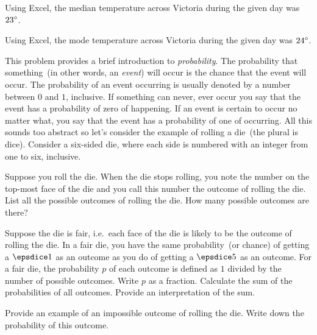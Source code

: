\documentclass[a4paper,oneside,12pt]{article}
\begin{document}
\begin{problem}
{\begin{solution}
Using Excel, the median temperature across Victoria during the given
day was ${23}^{\circ}$.

Using Excel, the mode temperature across Victoria during the given day
was ${24}^{\circ}$.
\end{solution}
}{}

\item\label{prob:fair_die}
  This problem provides a brief introduction to \emph{probability}.
  The probability that something~(in other words, an \emph{event})
  will occur is the chance that the event will occur.  The probability
  of an event occurring is usually denoted by a number between $0$ and
  $1$, inclusive.  If something can never, ever occur you say that the
  event has a probability of zero of happening.  If an event is
  certain to occur no matter what, you say that the event has a
  probability of one of occurring.  All this sounds too abstract so
  let's consider the example of rolling a die~(the plural is dice).
  Consider a six-sided die, where each side is numbered with an
  integer from one to six, inclusive.
  \begin{packedenum}
  \item\label{subprob:roll_die_possible_outcomes}
    Suppose you roll the die.  When the die stops rolling, you note
    the number on the top-most face of the die and you call this
    number the outcome of rolling the die.  List all the possible
    outcomes of rolling the die.  How many possible outcomes are
    there?

  \item\label{subprob:roll_die_probability}
    Suppose the die is fair, i.e.~each face of the die is likely to be
    the outcome of rolling the die.  In a fair die, you have the same
    probability~(or chance) of getting a $\dice{1}$ as an outcome as
    you do of getting a $\dice{5}$ as an outcome.  For a fair die, the
    probability $p$ of each outcome is defined as $1$ divided by the
    number of possible outcomes.  Write $p$ as a fraction.  Calculate
    the sum of the probabilities of all outcomes.  Provide an
    interpretation of the sum.

  \item\label{subprob:roll_die_impossible_outcome}
    Provide an example of an impossible outcome of rolling the die.
    Write down the probability of this outcome.
  \end{packedenum}
\end{problem}
\end{document}
